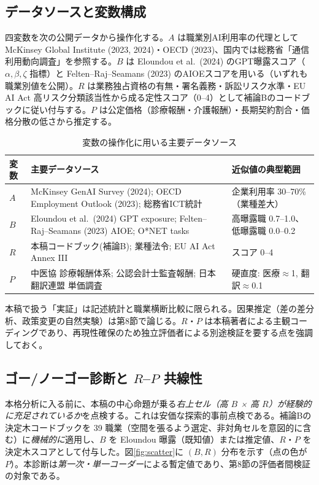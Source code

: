 \documentclass[11pt]{article}
\theoremstyle{plain}
\theoremstyle{definition}
\theoremstyle{remark}
\begin{document}
\subsection{データソースと変数構成}
四変数を次の公開データから操作化する。$A$ は職業別AI利用率の代理として McKinsey Global Institute (2023, 2024)・OECD (2023)、国内では総務省「通信利用動向調査」を参照する。$B$ は Eloundou et al.\ (2024) のGPT曝露スコア（$\alpha,\beta,\zeta$ 指標）と Felten--Raj--Seamans (2023) のAIOEスコアを用いる（いずれも職業別値を公開）。$R$ は業務独占資格の有無・署名義務・訴訟リスク水準・EU AI Act 高リスク分類該当性から成る定性スコア（0--4）として補論Bのコードブックに従い付与する。$P$ は公定価格（診療報酬・介護報酬）・長期契約割合・価格分散の低さから推定する。

\begin{table}[h]\centering\small
\caption{変数の操作化に用いる主要データソース}\label{tab:src}
\begin{tabularx}{\textwidth}{@{}lXl@{}}
\toprule
変数 & 主要データソース & 近似値の典型範囲 \\ \midrule
$A$ & McKinsey GenAI Survey (2024); OECD Employment Outlook (2023); 総務省ICT統計 & 企業利用率 30--70\%（業種差大） \\
$B$ & Eloundou et al.\ (2024) GPT exposure; Felten--Raj--Seamans (2023) AIOE; O*NET tasks & 高曝露職 0.7--1.0、低曝露職 0.0--0.2 \\
$R$ & 本稿コードブック(補論B); 業種法令; EU AI Act Annex III & スコア 0--4 \\
$P$ & 中医協 診療報酬体系; 公認会計士監査報酬; 日本翻訳連盟 単価調査 & 硬直度: 医療$\approx$1, 翻訳$\approx$0.1 \\
\bottomrule
\end{tabularx}
\end{table}

本稿で扱う「実証」は記述統計と職業横断比較に限られる。因果推定（差の差分析、政策変更の自然実験）は第8節で論じる。$R$・$P$ は本稿著者による主観コーディングであり、再現性確保のため独立評価者による別途検証を要する点を強調しておく。

\subsection{ゴー/ノーゴー診断と $R$--$P$ 共線性}\label{sec:gonogo}
本格分析に入る前に、本稿の中心命題が乗る\emph{右上セル（高 $B$ × 高 $R$）が経験的に充足されているか}を点検する。これは安価な探索的事前点検である。補論Bの決定木コードブックを 39 職業（空間を張るよう選定、非対角セルを意図的に含む）に\emph{機械的に}適用し、$B$ を Eloundou 曝露（既知値）または推定値、$R$・$P$ を決定木スコアとして付与した。図\ref{fig:scatter}に $(B,R)$ 分布を示す（点の色が $P$）。本診断は\emph{第一次・単一コーダー}による暫定値であり、第8節の評価者間検証の対象である。
\end{document}
